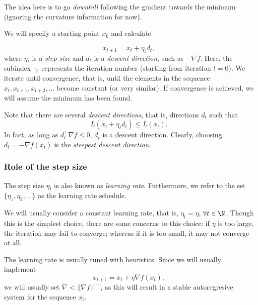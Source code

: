 The idea here is to go \emph{downhill} following the gradient towards the minimum (ignoring the curvature information for now). 

We will specify a starting point $x_0$ and calculate

\begin{equation}
	x_{t+1} = x_t + \eta_t d_t,
\end{equation}
where $\eta_t$ is a \emph{step size} and $d_t$ is a \emph{descent direction}, such as $-\nabla f$. Here, the subindex $\cdot_t$ represents the iteration number (starting from iteration $t=0$). We iterate until convergence, that is, until the elements in the sequence $x_t,x_{t+1}, x_{t+2},\ldots$ become constant (or very similar). If convergence is achieved, we will assume the minimum has been found. 

Note that there are several \emph{descent directions}, that is, directions $d_t$ such that 
\begin{equation}
	L( x_t + \eta_t d_t) \leq L(x_t).
\end{equation}
In fact, as long as $d_t^\top\nabla f \leq 0$, $d_t$ is a descent direction. Clearly, choosing $d_t = -\nabla f(x_t)$ is the \emph{steepest descent direction}.


\subsubsection{Role of the step size}
\label{ssub:stepsize}

The step size $\eta_t$ is also known as \emph{learning rate}. Furthermore,  we refer to the set $\{\eta_1,\eta_2,\ldots\}$ as the learning rate schedule.

We will usually consider a constant learning rate, that is, $\eta_t = \eta$, $\forall t\in\N$. Though this is the simplest choice, there are some concerns to this choice: if $\eta$ is too large, the iteration may fail to converge; whereas if it is too small, it may not converge at all. 


\begin{mdframed}[style=ejemplo, frametitle={\center Example: convergence for a parabola}]


\end{mdframed}

The learning rate is usually tuned with heuristics. Since we will usually implement 
\begin{equation}
	x_{t+1} = x_t + \eta \nabla f(x_t),
\end{equation}
we will usually set $\nabla<||\nabla f||^{-1}$, as this will result in a stable autoregresive system for the sequence $x_t$. 



